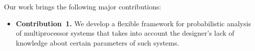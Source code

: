 Our work brings the following major contributions:
\begin{itemize}

\item \textbf{Contribution~1.} We develop a flexible framework for probabilistic
  analysis of multiprocessor systems that takes into account the designer's lack
  of knowledge about certain parameters of such systems.

\end{itemize}
